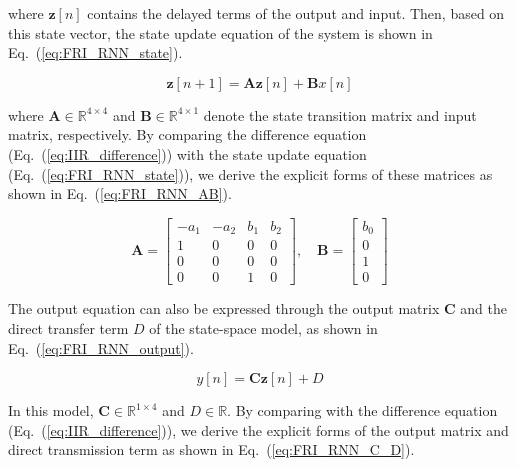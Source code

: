 \documentclass[journal]{IEEEtran}
\begin{document}
          
where $\mathbf{z}[n]$ contains the delayed terms of the output and input. Then, based on this state vector, the state update equation of the system is shown in Eq.~(\ref{eq:FRI_RNN_state}).


          \begin{equation}
              \mathbf{z}[n+1] = \mathbf{A} \mathbf{z}[n] + \mathbf{B} x[n]
              \label{eq:FRI_RNN_state}
          \end{equation}

          
where $\mathbf{A} \in \mathbb{R}^{4 \times 4}$ and $\mathbf{B} \in \mathbb{R}^{4 \times 1}$ denote the state transition matrix and input matrix, respectively. By comparing the difference equation (Eq.~(\ref{eq:IIR_difference})) with the state update equation (Eq.~(\ref{eq:FRI_RNN_state})), we derive the explicit forms of these matrices as shown in Eq.~(\ref{eq:FRI_RNN_AB}).


          \begin{equation}
              \mathbf{A} = \begin{bmatrix}
                  -a_1 & -a_2 & b_1 & b_2 \\
                  1    & 0    & 0   & 0   \\
                  0    & 0    & 0   & 0   \\
                  0    & 0    & 1   & 0
              \end{bmatrix}, \quad
              \mathbf{B} = \begin{bmatrix}
                  b_0 \\
                  0   \\
                  1   \\
                  0
              \end{bmatrix}
              \label{eq:FRI_RNN_AB}
          \end{equation}

          The output equation can also be expressed through the output matrix $\mathbf{C}$ and the direct transfer term $D$ of the state-space model, as shown in Eq.~(\ref{eq:FRI_RNN_output}).

          \begin{equation}
              y[n] = \mathbf{C} \mathbf{z}[n] + D
              \label{eq:FRI_RNN_output}
          \end{equation}

          
          In this model, $\mathbf{C} \in \mathbb{R}^{1 \times 4}$ and $D \in \mathbb{R}$. By comparing with the difference equation (Eq.~(\ref{eq:IIR_difference})), we derive the explicit forms of the output matrix and direct transmission term as shown in Eq.~(\ref{eq:FRI_RNN_C_D}).
\end{document}
